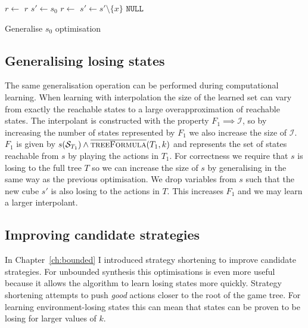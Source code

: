 \begin{algorithm}
    \begin{algorithmic}
            \State $r \gets $ 
             \Return $r$ \EndIIf
            \State $s' \gets s_0$
            \State $r \gets$  
                    \State $s' \gets s' \setminus \{x\}$ 
                \EndIf 
            \EndFor
            \State \Return $\texttt{NULL}$
        \EndFunction
    \end{algorithmic}
    \caption{Generalise $s_0$ optimisation}
    \label{alg:opt1}
\end{algorithm}

\subsection{Generalising losing states}

The same generalisation operation can be performed during computational learning. When learning with interpolation the size of the learned set can vary from exactly the reachable states to a large overapproximation of reachable states. The interpolant is constructed with the property $F_1 \implies \mathcal{I}$, so by increasing the number of states represented by $F_1$ we also increase the size of $\mathcal{I}$. $F_1$ is given by $s(\mathcal{S}_{T_1}) \land \textsc{$\overline{\mbox{treeFormula}}$}(T_1, k)$ and represents the set of states reachable from $s$ by playing the actions in $T_1$. For correctness we require that $s$ is losing to the full tree $T$ so we can increase the size of $s$ by generalising in the same way as the previous optimisation. We drop variables from $s$ such that the new cube $s'$ is also losing to the actions in $T$. This increases $F_1$ and we may learn a larger interpolant.

\subsection{Improving candidate strategies}

In Chapter~\ref{ch:bounded} I introduced strategy shortening to improve candidate strategies. For unbounded synthesis this optimisations is even more useful because it allows the algorithm to learn losing states more quickly. Strategy shortening attempts to push \emph{good} actions closer to the root of the game tree. For learning environment-losing states this can mean that states can be proven to be losing for larger values of $k$. 

